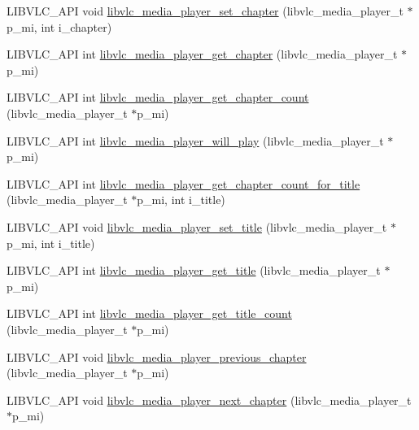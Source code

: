 \begin{DoxyCompactItemize}
\item 
L\+I\+B\+V\+L\+C\+\_\+\+A\+PI void \hyperlink{group__libvlc__media__player_gae8f1cbc7f17ab01c99511adf1b457860}{libvlc\+\_\+media\+\_\+player\+\_\+set\+\_\+chapter} (libvlc\+\_\+media\+\_\+player\+\_\+t $\ast$p\+\_\+mi, int i\+\_\+chapter)
\item 
L\+I\+B\+V\+L\+C\+\_\+\+A\+PI int \hyperlink{group__libvlc__media__player_gabd8bdd2acfab5d780917f9afec77256a}{libvlc\+\_\+media\+\_\+player\+\_\+get\+\_\+chapter} (libvlc\+\_\+media\+\_\+player\+\_\+t $\ast$p\+\_\+mi)
\item 
L\+I\+B\+V\+L\+C\+\_\+\+A\+PI int \hyperlink{group__libvlc__media__player_gaca201f5b20c3e8f2aeb4b65089620a64}{libvlc\+\_\+media\+\_\+player\+\_\+get\+\_\+chapter\+\_\+count} (libvlc\+\_\+media\+\_\+player\+\_\+t $\ast$p\+\_\+mi)
\item 
L\+I\+B\+V\+L\+C\+\_\+\+A\+PI int \hyperlink{group__libvlc__media__player_ga3c38df27467a03f96f9ed0f6b585baaa}{libvlc\+\_\+media\+\_\+player\+\_\+will\+\_\+play} (libvlc\+\_\+media\+\_\+player\+\_\+t $\ast$p\+\_\+mi)
\item 
L\+I\+B\+V\+L\+C\+\_\+\+A\+PI int \hyperlink{group__libvlc__media__player_ga65061437d5b8f6ef9811f750118adaba}{libvlc\+\_\+media\+\_\+player\+\_\+get\+\_\+chapter\+\_\+count\+\_\+for\+\_\+title} (libvlc\+\_\+media\+\_\+player\+\_\+t $\ast$p\+\_\+mi, int i\+\_\+title)
\item 
L\+I\+B\+V\+L\+C\+\_\+\+A\+PI void \hyperlink{group__libvlc__media__player_ga39d28c13c551c195d4228dec1aa0b5e6}{libvlc\+\_\+media\+\_\+player\+\_\+set\+\_\+title} (libvlc\+\_\+media\+\_\+player\+\_\+t $\ast$p\+\_\+mi, int i\+\_\+title)
\item 
L\+I\+B\+V\+L\+C\+\_\+\+A\+PI int \hyperlink{group__libvlc__media__player_gafdaefc462fcab5c4fdd862d5ee3a226d}{libvlc\+\_\+media\+\_\+player\+\_\+get\+\_\+title} (libvlc\+\_\+media\+\_\+player\+\_\+t $\ast$p\+\_\+mi)
\item 
L\+I\+B\+V\+L\+C\+\_\+\+A\+PI int \hyperlink{group__libvlc__media__player_gaa82c224660d1c88588dc9391be905396}{libvlc\+\_\+media\+\_\+player\+\_\+get\+\_\+title\+\_\+count} (libvlc\+\_\+media\+\_\+player\+\_\+t $\ast$p\+\_\+mi)
\item 
L\+I\+B\+V\+L\+C\+\_\+\+A\+PI void \hyperlink{group__libvlc__media__player_ga2b29595d53bcb7c0eed22e259b4f48c6}{libvlc\+\_\+media\+\_\+player\+\_\+previous\+\_\+chapter} (libvlc\+\_\+media\+\_\+player\+\_\+t $\ast$p\+\_\+mi)
\item 
L\+I\+B\+V\+L\+C\+\_\+\+A\+PI void \hyperlink{group__libvlc__media__player_ga6dfdfc7d9929c95d04b99d5d77847d48}{libvlc\+\_\+media\+\_\+player\+\_\+next\+\_\+chapter} (libvlc\+\_\+media\+\_\+player\+\_\+t $\ast$p\+\_\+mi)

\end{DoxyCompactItemize}
